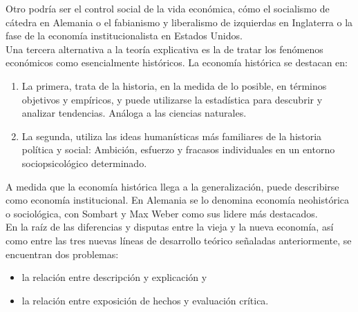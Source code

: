 Otro podría ser el control social de la vida económica, cómo el socialismo de cátedra en Alemania o el fabianismo y liberalismo de izquierdas en Inglaterra o la fase de la economía institucionalista en Estados Unidos.\\

 Una tercera alternativa a la teoría explicativa es la de tratar los fenómenos económicos como esencialmente históricos. La economía histórica se destacan en:

 \begin{enumerate}[1]
     \item La primera, trata de la historia, en la medida de lo posible, en términos objetivos y empíricos, y puede utilizarse la estadística para descubrir y analizar tendencias. Análoga a las ciencias naturales.
     \item La segunda, utiliza las ideas humanísticas más familiares de la historia política y social: Ambición, esfuerzo y fracasos individuales en un entorno sociopsicológico determinado.
 \end{enumerate}

 A medida que la economía histórica llega a la generalización, puede describirse como economía institucional. En Alemania se lo denomina economía neohistórica o sociológica, con Sombart y Max Weber como sus lidere más destacados.\\

En la raíz de las diferencias y disputas entre la vieja y la nueva economía, así como entre las tres nuevas líneas de desarrollo teórico señaladas anteriormente, se encuentran dos problemas:

 \begin{itemize}
     \item  la relación entre descripción y explicación y 
     \item la relación entre exposición de hechos y evaluación crítica.
 \end{itemize}

